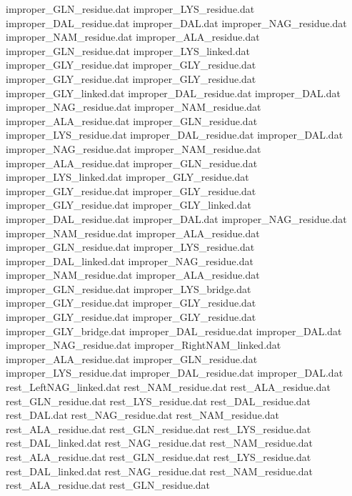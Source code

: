 improper_GLN_residue.dat        
improper_LYS_residue.dat        
improper_DAL_residue.dat        
improper_DAL.dat                
improper_NAG_residue.dat        
improper_NAM_residue.dat        
improper_ALA_residue.dat        
improper_GLN_residue.dat        
improper_LYS_linked.dat         
improper_GLY_residue.dat
improper_GLY_residue.dat
improper_GLY_residue.dat
improper_GLY_residue.dat
improper_GLY_linked.dat
improper_DAL_residue.dat        
improper_DAL.dat                
improper_NAG_residue.dat        
improper_NAM_residue.dat        
improper_ALA_residue.dat        
improper_GLN_residue.dat        
improper_LYS_residue.dat        
improper_DAL_residue.dat        
improper_DAL.dat                
improper_NAG_residue.dat        
improper_NAM_residue.dat        
improper_ALA_residue.dat        
improper_GLN_residue.dat        
improper_LYS_linked.dat         
improper_GLY_residue.dat
improper_GLY_residue.dat
improper_GLY_residue.dat
improper_GLY_residue.dat
improper_GLY_linked.dat
improper_DAL_residue.dat        
improper_DAL.dat                
improper_NAG_residue.dat        
improper_NAM_residue.dat        
improper_ALA_residue.dat        
improper_GLN_residue.dat        
improper_LYS_residue.dat        
improper_DAL_linked.dat         
improper_NAG_residue.dat        
improper_NAM_residue.dat        
improper_ALA_residue.dat        
improper_GLN_residue.dat        
improper_LYS_bridge.dat         
improper_GLY_residue.dat
improper_GLY_residue.dat
improper_GLY_residue.dat
improper_GLY_residue.dat
improper_GLY_bridge.dat
improper_DAL_residue.dat        
improper_DAL.dat                
improper_NAG_residue.dat        
improper_RightNAM_linked.dat    
improper_ALA_residue.dat        
improper_GLN_residue.dat        
improper_LYS_residue.dat        
improper_DAL_residue.dat        
improper_DAL.dat                
rest_LeftNAG_linked.dat         
rest_NAM_residue.dat            
rest_ALA_residue.dat            
rest_GLN_residue.dat            
rest_LYS_residue.dat            
rest_DAL_residue.dat            
rest_DAL.dat                    
rest_NAG_residue.dat            
rest_NAM_residue.dat            
rest_ALA_residue.dat            
rest_GLN_residue.dat            
rest_LYS_residue.dat            
rest_DAL_linked.dat             
rest_NAG_residue.dat            
rest_NAM_residue.dat            
rest_ALA_residue.dat            
rest_GLN_residue.dat            
rest_LYS_residue.dat            
rest_DAL_linked.dat             
rest_NAG_residue.dat            
rest_NAM_residue.dat            
rest_ALA_residue.dat            
rest_GLN_residue.dat            
